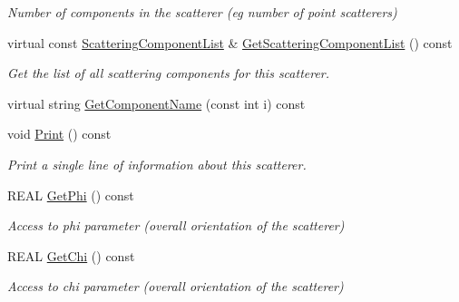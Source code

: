 \begin{DoxyCompactItemize}
\begin{DoxyCompactList}\small\item\em Number of components in the scatterer (eg number of point scatterers) \end{DoxyCompactList}\item 
virtual const \mbox{\hyperlink{class_obj_cryst_1_1_scattering_component_list}{Scattering\+Component\+List}} \& \mbox{\hyperlink{class_obj_cryst_1_1_z_scatterer_afebe0638df5f8f8cd3db05f69ed41a21}{Get\+Scattering\+Component\+List}} () const
\begin{DoxyCompactList}\small\item\em Get the list of all scattering components for this scatterer. \end{DoxyCompactList}\item 
virtual string \mbox{\hyperlink{class_obj_cryst_1_1_z_scatterer_a8202be8515c4f9117b666a22724df13c}{Get\+Component\+Name}} (const int i) const
\item 
\mbox{\label{class_obj_cryst_1_1_z_scatterer_abd1990ffaadd50814e2979d0fc409de0}} 
void \mbox{\hyperlink{class_obj_cryst_1_1_z_scatterer_abd1990ffaadd50814e2979d0fc409de0}{Print}} () const
\begin{DoxyCompactList}\small\item\em Print a single line of information about this scatterer. \end{DoxyCompactList}\item 
\mbox{\label{class_obj_cryst_1_1_z_scatterer_a72906206a3ad9c3e9b750abe9cb79e5d}} 
R\+E\+AL \mbox{\hyperlink{class_obj_cryst_1_1_z_scatterer_a72906206a3ad9c3e9b750abe9cb79e5d}{Get\+Phi}} () const
\begin{DoxyCompactList}\small\item\em Access to phi parameter (overall orientation of the scatterer) \end{DoxyCompactList}\item 
\mbox{\label{class_obj_cryst_1_1_z_scatterer_a946061c51fd5b99a2f22aa7e09ba35a6}} 
R\+E\+AL \mbox{\hyperlink{class_obj_cryst_1_1_z_scatterer_a946061c51fd5b99a2f22aa7e09ba35a6}{Get\+Chi}} () const
\begin{DoxyCompactList}\small\item\em Access to chi parameter (overall orientation of the scatterer) \end{DoxyCompactList}\item 

\end{DoxyCompactItemize}
